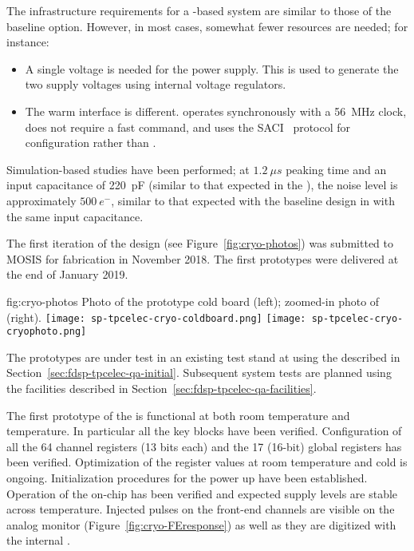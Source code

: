 The infrastructure requirements for a  -based system are similar 
to those of the baseline option. However, in most cases, somewhat fewer resources are 
needed; for instance:
\begin{itemize}
\item A single voltage is needed for the power supply. This is used to generate the two 
supply voltages using internal voltage regulators.
\item The warm interface is different.  operates synchronously
with a \SI{56}{MHz} clock, does not require a fast command, and uses the 
SACI~\cite{SACI} protocol for configuration rather than .
\end{itemize}

Simulation-based studies have been performed; at $\SI{1.2}{{\mu}s}$ peaking time and an 
input capacitance of \SI{220}{pF} (similar to that expected in the ), the noise 
level is approximately $\SI{500}{e^{-}}$, similar to that expected with the baseline 
 design in  with the same input capacitance.

The first iteration of the   design (see Figure~\ref{fig:cryo-photos}) 
was submitted to MOSIS for fabrication in November 2018. The first prototypes were 
delivered at the end of January 2019.

\begin{dunefigure}
{fig:cryo-photos}
{Photo of the prototype cold board (left); zoomed-in photo of   (right).}
\texttt{[image: sp-tpcelec-cryo-coldboard.png]}
\hspace{1cm}
\texttt{[image: sp-tpcelec-cryo-cryophoto.png]}
\end{dunefigure}

The prototypes are under test in an existing test stand at  using the 
described in Section~\ref{sec:fdsp-tpcelec-qa-initial}. Subsequent system tests are planned 
using the facilities described in Section~\ref{sec:fdsp-tpcelec-qa-facilities}.

The first prototype of the  is functional at both room temperature and \lntwo 
temperature. In particular all the key blocks have been verified. Configuration of all the 
64 channel registers (13 bits each) and the 17 (16-bit) global registers has been 
verified. Optimization of the register values at room temperature and cold is 
ongoing. Initialization procedures for the  power up have been established. 
Operation of the on-chip  has been verified and expected supply levels are 
stable across temperature. Injected pulses on the front-end channels are visible on 
the analog monitor (Figure~\ref{fig:cryo-FEresponse}) as well as they are digitized 
with the internal .

